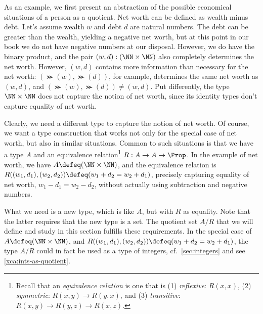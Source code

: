 As an example, we first present an abstraction of the possible
economical situations of a person as a quotient.
Net worth can be defined as wealth minus debt.
Let's assume wealth $w$ and debt $d$ are natural numbers.
The debt can be greater than the wealth, yielding a negative net worth,
but at this point in our book we do not have negative numbers at our disposal.
However, we do have the binary product, and the pair
$(w,d): (\NN\times\NN)$ also completely determines the net worth.
However, $(w,d)$ contains more information than necessary for the net worth:
$(\Succ(w),\Succ(d))$, for example, determines the same net worth
as $(w,d)$, and $(\Succ(w),\Succ(d))\ne(w,d)$. Put differently,
the type $\NN\times\NN$ does not capture the notion of net worth,
since its identity types don't capture equality of net worth.

Clearly, we need a different type to capture the notion of net worth.
Of course, we want a type construction that works not only for
the special case of net worth, but also in similar situations.
Common to such situations is that we have a type $A$ and an
equivalence relation\footnote{\label{ft:equiv-rel}%
  Recall that an \emph{equivalence relation} is one that is
  (1) \emph{reflexive}: $R(x,x)$,
  (2) \emph{symmetric}: $R(x,y) \to R(y,x)$, and
  (3) \emph{transitive}: $R(x,y) \to R(y,z) \to R(x,z)$.}
$R : A\to A\to \Prop$. In the example of net worth, we have
$A\defeq(\NN\times\NN)$, and the equivalence relation is
$R((w_1,d_1),(w_2,d_2)) \defeq  (w_1+d_2 = w_2 + d_1)$,
precisely capturing equality of net worth, $w_1 - d_1 = w_2 - d_2$,
without actually using subtraction and negative numbers.

What we need is a new type, which is like $A$, but with $R$ as equality.
Note that the latter requires that the new type is a set.
The quotient set $A/R$ that we will define and study in this
section fulfills these requirements.
In the special case of $A\defeq(\NN\times\NN)$, and
$R((w_1,d_1),(w_2,d_2)) \defeq  (w_1+d_2 = w_2 + d_1)$,
the type $A/R$ could in fact be used as a type of integers,
cf.\ \cref{sec:integers} and see \cref{xca:ints-as-quotient}.

